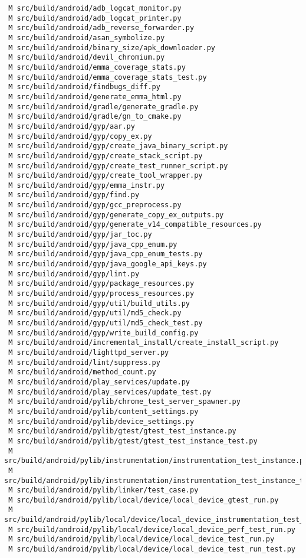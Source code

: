 \documentclass{article}
\begin{document}
\begin{verbatim}
 M src/build/android/adb_logcat_monitor.py
 M src/build/android/adb_logcat_printer.py
 M src/build/android/adb_reverse_forwarder.py
 M src/build/android/asan_symbolize.py
 M src/build/android/binary_size/apk_downloader.py
 M src/build/android/devil_chromium.py
 M src/build/android/emma_coverage_stats.py
 M src/build/android/emma_coverage_stats_test.py
 M src/build/android/findbugs_diff.py
 M src/build/android/generate_emma_html.py
 M src/build/android/gradle/generate_gradle.py
 M src/build/android/gradle/gn_to_cmake.py
 M src/build/android/gyp/aar.py
 M src/build/android/gyp/copy_ex.py
 M src/build/android/gyp/create_java_binary_script.py
 M src/build/android/gyp/create_stack_script.py
 M src/build/android/gyp/create_test_runner_script.py
 M src/build/android/gyp/create_tool_wrapper.py
 M src/build/android/gyp/emma_instr.py
 M src/build/android/gyp/find.py
 M src/build/android/gyp/gcc_preprocess.py
 M src/build/android/gyp/generate_copy_ex_outputs.py
 M src/build/android/gyp/generate_v14_compatible_resources.py
 M src/build/android/gyp/jar_toc.py
 M src/build/android/gyp/java_cpp_enum.py
 M src/build/android/gyp/java_cpp_enum_tests.py
 M src/build/android/gyp/java_google_api_keys.py
 M src/build/android/gyp/lint.py
 M src/build/android/gyp/package_resources.py
 M src/build/android/gyp/process_resources.py
 M src/build/android/gyp/util/build_utils.py
 M src/build/android/gyp/util/md5_check.py
 M src/build/android/gyp/util/md5_check_test.py
 M src/build/android/gyp/write_build_config.py
 M src/build/android/incremental_install/create_install_script.py
 M src/build/android/lighttpd_server.py
 M src/build/android/lint/suppress.py
 M src/build/android/method_count.py
 M src/build/android/play_services/update.py
 M src/build/android/play_services/update_test.py
 M src/build/android/pylib/chrome_test_server_spawner.py
 M src/build/android/pylib/content_settings.py
 M src/build/android/pylib/device_settings.py
 M src/build/android/pylib/gtest/gtest_test_instance.py
 M src/build/android/pylib/gtest/gtest_test_instance_test.py
 M src/build/android/pylib/instrumentation/instrumentation_test_instance.py
 M src/build/android/pylib/instrumentation/instrumentation_test_instance_test.py
 M src/build/android/pylib/linker/test_case.py
 M src/build/android/pylib/local/device/local_device_gtest_run.py
 M src/build/android/pylib/local/device/local_device_instrumentation_test_run.py
 M src/build/android/pylib/local/device/local_device_perf_test_run.py
 M src/build/android/pylib/local/device/local_device_test_run.py
 M src/build/android/pylib/local/device/local_device_test_run_test.py

\end{verbatim}
\end{document}
